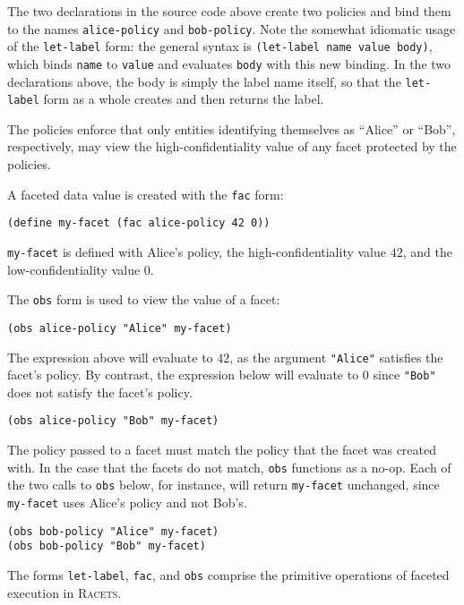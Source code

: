 \documentclass{article}
\begin{document}
The two declarations in the source code above create two policies and bind them to the names \texttt{alice-policy} and \texttt{bob-policy}. Note the somewhat idiomatic usage of the \texttt{let-label} form: the general syntax is \texttt{(let-label name value body)}, which binds \texttt{name} to \texttt{value} and evaluates \texttt{body} with this new binding. In the two declarations above, the body is simply the label name itself, so that the \texttt{let-label} form as a whole creates and then returns the label.

The policies enforce that only entities identifying themselves as ``Alice'' or ``Bob'', respectively, may view the high-confidentiality value of any facet protected by the policies.

A faceted data value is created with the \texttt{fac} form:

\begin{lstlisting}
(define my-facet (fac alice-policy 42 0))
\end{lstlisting}

\texttt{my-facet} is defined with Alice's policy, the high-confidentiality value $42$, and the low-confidentiality value $0$.

The \texttt{obs} form is used to view the value of a facet:

\begin{lstlisting}
(obs alice-policy "Alice" my-facet)
\end{lstlisting}

The expression above will evaluate to $42$, as the argument \texttt{"Alice"} satisfies the facet's policy. By contrast, the expression below will evaluate to $0$ since \texttt{"Bob"} does not satisfy the facet's policy.

\begin{lstlisting}
(obs alice-policy "Bob" my-facet)
\end{lstlisting}

The policy passed to a facet must match the policy that the facet was created with. In the case that the facets do not match, \texttt{obs} functions as a no-op. Each of the two calls to \texttt{obs} below, for instance, will return \texttt{my-facet} unchanged, since \texttt{my-facet} uses Alice's policy and not Bob's.

\begin{lstlisting}
(obs bob-policy "Alice" my-facet)
(obs bob-policy "Bob" my-facet)
\end{lstlisting}

The forms \texttt{let-label}, \texttt{fac}, and \texttt{obs} comprise the primitive operations of faceted execution in \textsc{Racets}.
\end{document}
